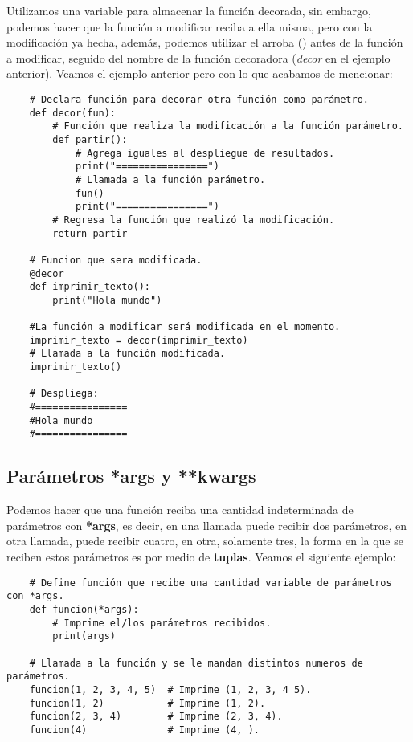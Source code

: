 Utilizamos una variable para almacenar la función decorada, sin embargo, podemos hacer que la función a modificar reciba a ella misma, pero con la modificación ya hecha, además, podemos utilizar el arroba (\@) antes de la función a modificar, seguido del nombre de la función decoradora (\textit{decor} en el ejemplo anterior). Veamos el ejemplo anterior pero con lo que acabamos de mencionar:
\begin{lstlisting}
    # Declara función para decorar otra función como parámetro.
    def decor(fun):
        # Función que realiza la modificación a la función parámetro.
        def partir():
            # Agrega iguales al despliegue de resultados.
            print("================")
            # Llamada a la función parámetro.
            fun()
            print("================")
        # Regresa la función que realizó la modificación.
        return partir

    # Funcion que sera modificada.
    @decor
    def imprimir_texto():
        print("Hola mundo")

    #La función a modificar será modificada en el momento.
    imprimir_texto = decor(imprimir_texto)
    # Llamada a la función modificada.
    imprimir_texto()   

    # Despliega:
    #================
    #Hola mundo
    #================
\end{lstlisting}


\subsection{Parámetros *args y **kwargs}

Podemos hacer que una función reciba una cantidad indeterminada de parámetros con \textbf{*args}, es decir, en una llamada puede recibir dos parámetros, en otra llamada, puede recibir cuatro, en otra, solamente tres, la forma en la que se reciben estos parámetros es por medio de \textbf{tuplas}. Veamos el siguiente ejemplo:
\begin{lstlisting}
    # Define función que recibe una cantidad variable de parámetros con *args.
    def funcion(*args):
        # Imprime el/los parámetros recibidos.
        print(args)

    # Llamada a la función y se le mandan distintos numeros de parámetros.   
    funcion(1, 2, 3, 4, 5)  # Imprime (1, 2, 3, 4 5).
    funcion(1, 2)			# Imprime (1, 2).
    funcion(2, 3, 4)		# Imprime (2, 3, 4).
    funcion(4)				# Imprime (4, ).
\end{lstlisting}

